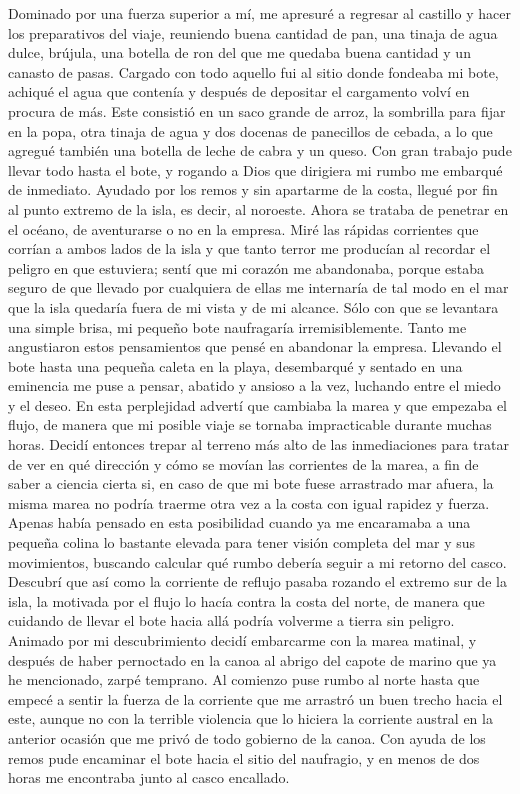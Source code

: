\documentclass{novela}
\begin{document}
    Dominado por una fuerza superior a mí, me apresuré a regresar al castillo y hacer los preparativos del viaje, reuniendo buena cantidad de pan, una tinaja de agua dulce, brújula, una botella de ron del que me quedaba buena cantidad y un canasto de pasas. Cargado con todo aquello fui al sitio donde fondeaba mi bote, achiqué el agua que contenía y después de depositar el cargamento volví en procura de más. Este consistió en un saco grande de arroz, la sombrilla para fijar en la popa, otra tinaja de agua y dos docenas de panecillos de cebada, a lo que agregué también una botella de leche de cabra y un queso. Con gran trabajo pude llevar todo hasta el bote, y rogando a Dios que dirigiera mi rumbo me embarqué de inmediato. Ayudado por los remos y sin apartarme de la costa, llegué por fin al punto extremo de la isla, es decir, al noroeste. Ahora se trataba de penetrar en el océano, de aventurarse o no en la empresa. Miré las rápidas corrientes que corrían a ambos lados de la isla y que tanto terror me producían al recordar el peligro en que estuviera; sentí que mi corazón me abandonaba, porque estaba seguro de que llevado por cualquiera de ellas me internaría de tal modo en el mar que la isla quedaría fuera de mi vista y de mi alcance. Sólo con que se levantara una simple brisa, mi pequeño bote naufragaría irremisiblemente.
    Tanto me angustiaron estos pensamientos que pensé en abandonar la empresa. Llevando el bote hasta una pequeña caleta en la playa, desembarqué y sentado en una eminencia me puse a pensar, abatido y ansioso a la vez, luchando entre el miedo y el deseo. En esta perplejidad advertí que cambiaba la marea y que empezaba el flujo, de manera que mi posible viaje se tornaba impracticable durante muchas horas.
    Decidí entonces trepar al terreno más alto de las inmediaciones para tratar de ver en qué dirección y cómo se movían las corrientes de la marea, a fin de saber a ciencia cierta si, en caso de que mi bote fuese arrastrado mar afuera, la misma marea no podría traerme otra vez a la costa con igual rapidez y fuerza. Apenas había pensado en esta posibilidad cuando ya me encaramaba a una pequeña colina lo bastante elevada para tener visión completa del mar y sus movimientos, buscando calcular qué rumbo debería seguir a mi retorno del casco. Descubrí que así como la corriente de reflujo pasaba rozando el extremo sur de la isla, la motivada por el flujo lo hacía contra la costa del norte, de manera que cuidando de llevar el bote hacia allá podría volverme a tierra sin peligro.
    Animado por mi descubrimiento decidí embarcarme con la marea matinal, y después de haber pernoctado en la canoa al abrigo del capote de marino que ya he mencionado, zarpé temprano. Al comienzo puse rumbo al norte hasta que empecé a sentir la fuerza de la corriente que me arrastró un buen trecho hacia el este, aunque no con la terrible violencia que lo hiciera la corriente austral en la anterior ocasión que me privó de todo gobierno de la canoa. Con ayuda de los remos pude encaminar el bote hacia el sitio del naufragio, y en menos de dos horas me encontraba junto al casco encallado.
\end{document}
